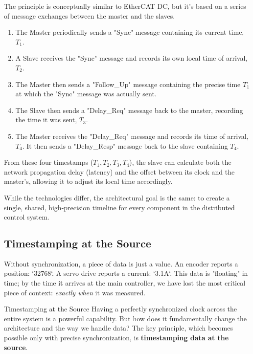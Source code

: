 The principle is conceptually similar to EtherCAT DC, but it's based on a series of message exchanges between the master and the slaves.
\begin{enumerate}
    \item The Master periodically sends a "Sync" message containing its current time, $T_1$.
    \item A Slave receives the "Sync" message and records its own local time of arrival, $T_2$.
    \item The Master then sends a "Follow\_Up" message containing the precise time $T_1$ at which the "Sync" message was actually sent.
    \item The Slave then sends a "Delay\_Req" message back to the master, recording the time it was sent, $T_3$.
    \item The Master receives the "Delay\_Req" message and records its time of arrival, $T_4$. It then sends a "Delay\_Resp" message back to the slave containing $T_4$.
\end{enumerate}
From these four timestamps ($T_1, T_2, T_3, T_4$), the slave can calculate both the network propagation delay (latency) and the offset between its clock and the master's, allowing it to adjust its local time accordingly.

While the technologies differ, the architectural goal is the same: to create a single, shared, high-precision timeline for every component in the distributed control system.


\subsection{Timestamping at the Source}
\label{subsec:timestamping_insight}

Without synchronization, a piece of data is just a value. An encoder reports a position: `32768`. A servo drive reports a current: `3.1A`. This data is "floating" in time; by the time it arrives at the main controller, we have lost the most critical piece of context: \textit{exactly when} it was measured.

\begin{tipbox}{Timestamping at the Source}
    Having a perfectly synchronized clock across the entire system is a powerful capability. But how does it fundamentally change the architecture and the way we handle data? The key principle, which becomes possible only with precise synchronization, is \textbf{timestamping data at the source}.
\end{tipbox}

